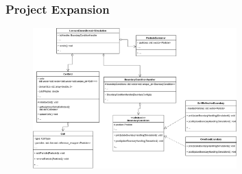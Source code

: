 \begin{frame}
    \frametitle{Project Expansion}
    \begin{figure}
        \label{fig:umlcellgrid}
        \includegraphics[width=0.7\textwidth]{res/UML3.drawio}
    \end{figure}
\end{frame}